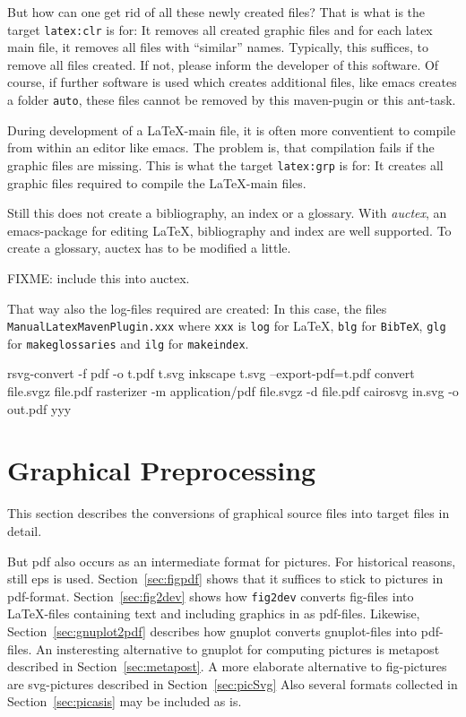 \documentclass[12pt]{book}
\begin{document}
But how can one get rid of all these newly created files? 
That is what is the target {\tt latex:clr} is for: 
It removes all created graphic files 
and for each latex main file, it removes all files with ``similar'' names. 
Typically, this suffices, to remove all files created. 
If not, please inform the developer of this software. 
Of course, if further software is used which creates additional files, 
like emacs creates a folder {\tt auto}, 
these files cannot be removed by this maven-pugin or this ant-task. 

During development of a \LaTeX-main file, 
it is often more conventient to compile from within an editor like emacs. 
The problem is, that compilation fails if the graphic files are missing. 
This is what the target {\tt latex:grp} is for: 
It creates all graphic files required to compile the \LaTeX-main files. 

Still this does not create a bibliography, an index or a glossary. 
With {\em auctex}, an emacs-package for editing \LaTeX, 
bibliography and index are well supported. 
To create a glossary, auctex has to be modified a little. 

FIXME: include this into auctex. 

That way also the log-files required are created: 
In this case, the files {\tt ManualLatexMavenPlugin.xxx} 
where {\tt xxx} is {\tt log} for \LaTeX, {\tt blg} for {\tt BibTeX}, 
{\tt glg} for {\tt makeglossaries} and {\tt ilg} for {\tt makeindex}. 


rsvg-convert -f pdf -o t.pdf t.svg
inkscape t.svg --export-pdf=t.pdf
convert file.svgz file.pdf 
rasterizer -m application/pdf file.svgz -d file.pdf
cairosvg in.svg -o out.pdf
yyy

\chapter{Graphical Preprocessing}\label{chap:GraphConversions}

This section describes the conversions of 
graphical source files into target files 
in detail. 

But pdf also occurs as an intermediate format for pictures. 
For historical reasons, still \gls{eps} is used. 
Section~\ref{sec:figpdf} shows that it suffices to stick to pictures 
in pdf-format. 
Section~\ref{sec:fig2dev} shows how {\tt fig2dev} converts fig-files 
into \LaTeX-files containing text and including graphics in as pdf-files. 
Likewise, Section~\ref{sec:gnuplot2pdf} describes 
how gnuplot converts gnuplot-files into pdf-files. 
An insteresting alternative to gnuplot for computing pictures 
is metapost described in Section~\ref{sec:metapost}. 
A more elaborate alternative to fig-pictures are svg-pictures 
described in Section~\ref{sec:picSvg}
Also several formats collected in Section~\ref{sec:picasis} 
may be included as is. 
\end{document}
